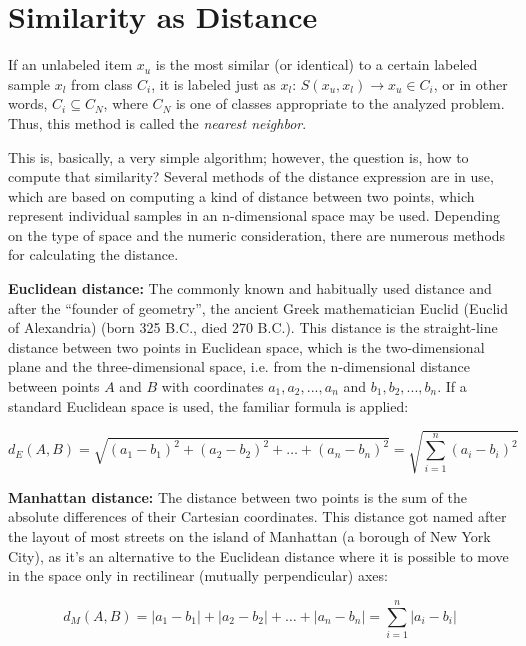 \documentclass[11pt,openany,executivepaper]{book}
\begin{document}
\section{Similarity as Distance}

If an unlabeled item $x_u$ is the most similar (or identical) to a certain labeled sample 
$x_l$ from class $C_i$, it is labeled just as $x_l$: 
$S(x_u, x_l) \rightarrow x_u \in C_i$, or in other words, 
$C_i \subseteq C_N$, where $C_N$ is one of classes appropriate to the analyzed problem.
Thus, this method is called the \textit{nearest neighbor}.

This is, basically, a very simple algorithm; however, the question is, how to compute that similarity?
Several methods of the distance expression are in use, which are based on computing a kind of distance between two points,
which represent individual samples in an n-dimensional space may be used.
Depending on the type of space and the numeric consideration, there are numerous methods for calculating the distance.

\textbf{Euclidean distance:} The commonly known and habitually used distance
and after the “founder of geometry”, the ancient Greek mathematician Euclid
(Euclid of Alexandria) (born 325 B.C., died 270 B.C.).
This distance is the straight-line distance between two points in Euclidean space,
which is the two-dimensional plane and the three-dimensional space, i.e. from the n-dimensional
distance between points $A$ and $B$ with coordinates $a_1,a_2,...,a_n$ and $b_1,b_2,...,b_n$.
If a standard Euclidean space is used, the familiar formula is applied:

\begin{equation}
d_E(A,B) = \sqrt{(a_1 - b_1)^2 + (a_2 - b_2)^2 + \ldots + (a_n - b_n)^2}
= \sqrt{\sum_{i=1}^{n}(a_i - b_i)^2}
\tag{6.1}
\end{equation}

\textbf{Manhattan distance:} The distance between two points is the sum of the
absolute differences of their Cartesian coordinates. This distance got named after
the layout of most streets on the island of Manhattan (a borough of New York City),
as it's an alternative to the Euclidean distance where it is possible to move in the space only in
rectilinear (mutually perpendicular) axes:

\begin{equation}
d_M(A,B) = |a_1 - b_1| + |a_2 - b_2| + \ldots + |a_n - b_n|
= \sum_{i=1}^{n} |a_i - b_i|
\tag{6.2}
\end{equation}
\end{document}

